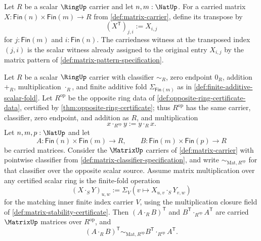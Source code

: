 \begin{definition}
\label{def:matrix-transpose-certified-scalar-carrier}
Let $R$ be a scalar $\RingUp$ carrier and let $n,m:\NatUp$. For a carried
matrix $X:\mathsf{Fin}(n)\times\mathsf{Fin}(m)\to R$ from
\autoref{def:matrix-carrier}, define its transpose by
$$
(X^{\mathsf{T}})_{j,i}:=X_{i,j}
$$
for $j:\mathsf{Fin}(m)$ and $i:\mathsf{Fin}(n)$. The carriedness witness at the
transposed index $(j,i)$ is the scalar witness already assigned to the original
entry $X_{i,j}$ by the matrix pattern of
\autoref{def:matrix-pattern-specification}.
\end{definition}

\begin{theorem}
\label{thm:matrix-transpose-reverses-product-over-opposite-ring}
Let $R$ be a scalar $\RingUp$ carrier with classifier $\sim_R$, zero endpoint
$0_R$, addition $+_R$, multiplication $\cdot_R$, and finite additive fold
$\Sigma_{\mathsf{Fin}(m)}$ as in \autoref{def:finite-additive-scalar-fold}. Let
$R^{\mathrm{op}}$ be the opposite ring data of
\autoref{def:opposite-ring-certificate-data}, certified by
\autoref{thm:opposite-ring-certificate}; thus $R^{\mathrm{op}}$ has the same
carrier, classifier, zero endpoint, and addition as $R$, and multiplication
$$
x\cdot_{R^{\mathrm{op}}}y:=y\cdot_Rx.
$$
Let $n,m,p:\NatUp$ and let
$$
A:\mathsf{Fin}(n)\times\mathsf{Fin}(m)\to R,
\qquad
B:\mathsf{Fin}(m)\times\mathsf{Fin}(p)\to R
$$
be carried matrices. Consider the $\MatrixUp$ carriers of
\autoref{def:matrix-carrier} with pointwise classifier from
\autoref{def:matrix-classifier-specification}, and write
$\sim_{\mathrm{Mat},R^{\mathrm{op}}}$ for that classifier over the opposite
scalar source. Assume matrix multiplication over any certified scalar ring is
the finite-fold operation
$$
(X\cdot_S Y)_{u,w}:=\Sigma_V(v\mapsto X_{u,v}\cdot_SY_{v,w})
$$
for the matching inner finite index carrier $V$, using the multiplication
closure field of \autoref{def:matrix-stability-certificate}. Then
$(A\cdot_RB)^{\mathsf{T}}$ and
$B^{\mathsf{T}}\cdot_{R^{\mathrm{op}}}A^{\mathsf{T}}$ are carried $\MatrixUp$
matrices over $R^{\mathrm{op}}$, and
$$
(A\cdot_RB)^{\mathsf{T}}
\sim_{\mathrm{Mat},R^{\mathrm{op}}}
B^{\mathsf{T}}\cdot_{R^{\mathrm{op}}}A^{\mathsf{T}}.
$$
\end{theorem}
